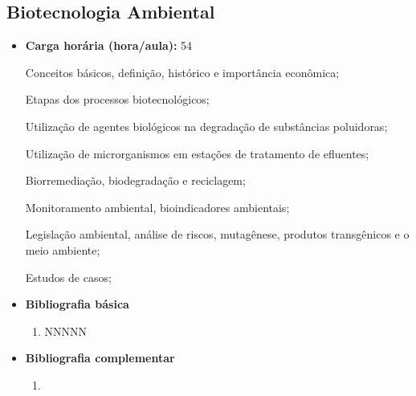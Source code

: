 \documentclass[11pt,fleqn]{book} %
\begin{document}
\subsection{Biotecnologia Ambiental}\label{disc:biotecAmb}
\begin{itemize}
	\item \textbf{Carga horária (hora/aula):} 54
	
	Conceitos básicos, definição, histórico e importância econômica; 
	
	Etapas dos processos biotecnológicos; 
	
	Utilização de agentes biológicos na degradação de substâncias poluidoras;
	
	Utilização de microrganismos em estações de tratamento de efluentes;
	
	Biorremediação, biodegradação e reciclagem;
	  
	Monitoramento ambiental, bioindicadores ambientais;
	
	Legislação ambiental, análise de riscos, mutagênese, produtos transgênicos e o meio ambiente;

	Estudos de casos;

	\item \textbf{Bibliografia básica}
	\begin{enumerate}
		\item NNNNN
	\end{enumerate}
	\item \textbf{Bibliografia complementar}
	\begin{enumerate}
		\item 
	\end{enumerate}	
\end{itemize}



\newpage
\end{document}
